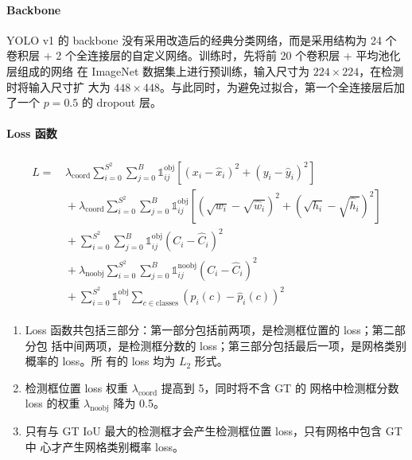 \paragraph{Backbone}

YOLO v1 的 backbone 没有采用改造后的经典分类网络，而是采用结构为 24 个卷积层 + 2
个全连接层的自定义网络。训练时，先将前 20 个卷积层 + 平均池化层组成的网络
在 ImageNet 数据集上进行预训练，输入尺寸为 $224 \times 224$，在检测时将输入尺寸扩
大为 $448 \times 448$。与此同时，为避免过拟合，第一个全连接层后加了一个 $p=0.5$
的 dropout 层。

\paragraph{Loss 函数}

\begin{align}
  \label{equ:yolo-v1-loss}
  \begin{split}
    L = & \, \lambda_{\mathrm{coord}} \sum_{i=0}^{S^2} \sum_{j=0}^{B} \mathds{1}_{ij}^{\mathrm{obj}} \left [ \left (x_i - \hat{x}_i \right )^2 + \left (y_i - \hat{y}_i \right )^2 \right ] \\
    & \, + \lambda_{\mathrm{coord}} \sum_{i=0}^{S^2} \sum_{j=0}^{B} \mathds{1}_{ij}^{\mathrm{obj}} \left [ \left(\sqrt{w_i} - \sqrt{\hat{w}_i} \right)^2 + \left (\sqrt{h_i} - \sqrt{\hat{h}_i} \right )^2 \right ]  \\
    & \, + \sum_{i=0}^{S^2} \sum_{j=0}^{B} \mathds{1}_{ij}^{\mathrm{obj}} \left( C_i - \hat{C}_i \right)^2  \\
    & \, + \lambda_{\mathrm{noobj}} \sum_{i=0}^{S^2} \sum_{j=0}^{B} \mathds{1}_{ij}^{\mathrm{noobj}} \left( C_i - \hat{C}_i \right)^2  \\
    & \, + \sum_{i=0}^{S^2} \mathds{1}_{i}^{\mathrm{obj}} \sum_{c \in \mathrm{classes}} \left( p_i(c) - \hat{p}_i(c) \right)^2
  \end{split}
\end{align}

\begin{enumerate}
  \item Loss 函数共包括三部分：第一部分包括前两项，是检测框位置的 loss；第二部分包
    括中间两项，是检测框分数的 loss；第三部分包括最后一项，是网格类别概率的 loss。所
    有的 loss 均为 $L_2$ 形式。
  \item 检测框位置 loss 权重 $\lambda_{\mathrm{coord}}$ 提高到 5，同时将不含 GT 的
    网格中检测框分数 loss 的权重 $\lambda_{\mathrm{noobj}}$ 降为 0.5。
  \item 只有与 GT IoU 最大的检测框才会产生检测框位置 loss，只有网格中包含 GT 中
    心才产生网格类别概率 loss。
\end{enumerate}

